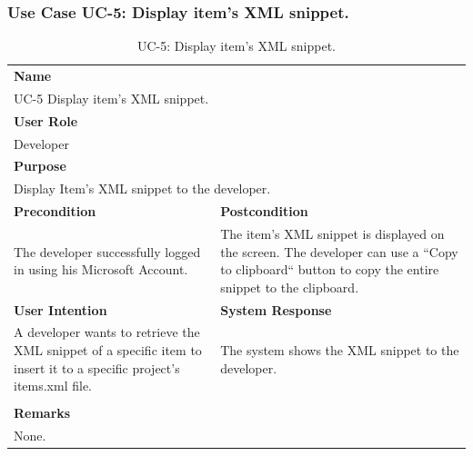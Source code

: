 \subsubsection{Use Case UC-5: Display item's XML snippet.}\label{subsubsec:use-case-uc-5:-display-item's-xml-snippet}

\begin{table}[H]
    \centering
    \begin{tabular}{|p{}|p{}|}

        \hline
        \multicolumn{2}{|l|}{\rowcolor{gray!50}\textbf{Name}} \\
        \multicolumn{2}{|l|}{UC-5 Display item's XML snippet.} \\ \hline

        \multicolumn{2}{|l|}{\rowcolor{gray!50}\textbf{User Role}} \\
        \multicolumn{2}{|l|}{Developer} \\ \hline

        \multicolumn{2}{|l|}{\rowcolor{gray!50}\textbf{Purpose}} \\
        \multicolumn{2}{|l|}{Display Item's XML snippet to the developer.} \\ \hline

        \rowcolor{gray!50}\textbf{Precondition} & \rowcolor{gray!50}\textbf{Postcondition} \\
        The developer successfully logged in using his Microsoft Account.
        &
        The item's XML snippet is displayed on the screen.
        The developer can use a ``Copy to clipboard`` button to copy the entire snippet to the clipboard.\\ \hline

        \rowcolor{gray!50}\textbf{User Intention} & \rowcolor{gray!50}\textbf{System Response} \\
        A developer wants to retrieve the XML snippet of a specific item to insert it to a specific project's items.xml file.
        &
        The system shows the XML snippet to the developer. \\ \hline

        & \\ \hline

        \multicolumn{2}{|l|}{\rowcolor{gray!50}\textbf{Remarks}} \\
        \multicolumn{2}{|p{1\textwidth}|}{None.} \\ \hline
    \end{tabular}
    \caption{UC-5: Display item's XML snippet.}
    \label{tab:uc-xml-snippet}
\end{table}

